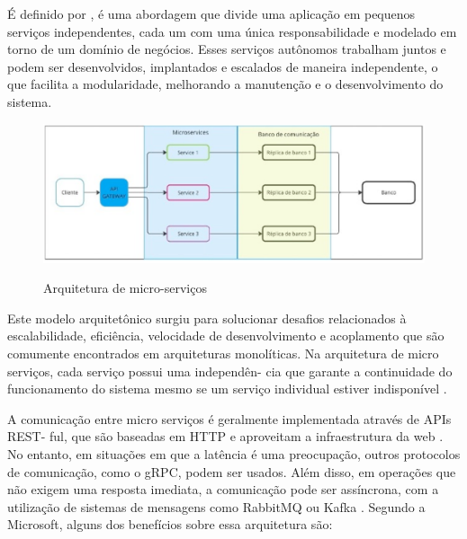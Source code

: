 É definido por \cite{Newman2015}, é uma abordagem que divide uma aplicação em
pequenos serviços independentes, cada um com uma única responsabilidade e modelado em
torno de um domínio de negócios. Esses serviços autônomos trabalham juntos e podem ser
desenvolvidos, implantados e escalados de maneira independente, o que facilita a modularidade,
melhorando a manutenção e o desenvolvimento do sistema.

\begin{figure}[!ht]
    \centering
    \caption{Arquitetura de micro-serviços}
    \includegraphics[scale=0.44]{assets/ms-arch}
    \label{fig:ms-arch}
    \tiny
    \sourcemedaddy
\end{figure}

Este modelo arquitetônico surgiu para solucionar desafios relacionados à escalabilidade,
eficiência, velocidade de desenvolvimento e acoplamento que são comumente encontrados em
arquiteturas monolíticas. Na arquitetura de micro serviços, cada serviço possui uma independên-
cia que garante a continuidade do funcionamento do sistema mesmo se um serviço individual
estiver indisponível \cite{Microsoft2023}.

A comunicação entre micro serviços é geralmente implementada através de APIs REST-
ful, que são baseadas em HTTP e aproveitam a infraestrutura da web \cite{LewisFowler}. No
entanto, em situações em que a latência é uma preocupação, outros protocolos de comunicação,
como o gRPC, podem ser usados.
Além disso, em operações que não exigem uma resposta
imediata, a comunicação pode ser assíncrona, com a utilização de sistemas de mensagens como
RabbitMQ ou Kafka \cite{Boner2019}.
Segundo a Microsoft, alguns dos benefícios sobre
essa arquitetura são:


